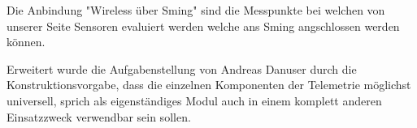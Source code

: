 Die Anbindung "Wireless über Sming" sind die Messpunkte bei welchen von unserer Seite Sensoren evaluiert werden welche ans Sming angschlossen werden können.

Erweitert wurde die Aufgabenstellung von Andreas Danuser durch die Konstruktionsvorgabe, dass die einzelnen Komponenten der Telemetrie möglichst universell, sprich als eigenständiges Modul auch in einem komplett anderen Einsatzzweck verwendbar sein sollen.

